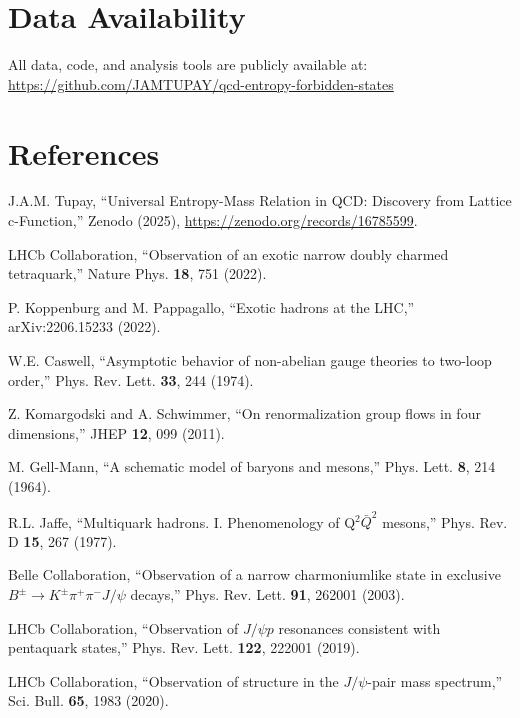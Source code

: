 \documentclass[12pt,a4paper]{article}
\begin{document}
\section*{Data Availability}

All data, code, and analysis tools are publicly available at: \url{https://github.com/JAMTUPAY/qcd-entropy-forbidden-states}

\section*{References}

\begin{thebibliography}{99}

J.A.M. Tupay,
``Universal Entropy-Mass Relation in QCD: Discovery from Lattice c-Function,''
Zenodo (2025),
\url{https://zenodo.org/records/16785599}.

LHCb Collaboration,
``Observation of an exotic narrow doubly charmed tetraquark,''
Nature Phys. \textbf{18}, 751 (2022).

P. Koppenburg and M. Pappagallo,
``Exotic hadrons at the LHC,''
arXiv:2206.15233 (2022).

W.E. Caswell,
``Asymptotic behavior of non-abelian gauge theories to two-loop order,''
Phys. Rev. Lett. \textbf{33}, 244 (1974).

Z. Komargodski and A. Schwimmer,
``On renormalization group flows in four dimensions,''
JHEP \textbf{12}, 099 (2011).

M. Gell-Mann,
``A schematic model of baryons and mesons,''
Phys. Lett. \textbf{8}, 214 (1964).

R.L. Jaffe,
``Multiquark hadrons. I. Phenomenology of Q$^2\bar{Q}^2$ mesons,''
Phys. Rev. D \textbf{15}, 267 (1977).

Belle Collaboration,
``Observation of a narrow charmoniumlike state in exclusive $B^\pm \to K^\pm \pi^+ \pi^- J/\psi$ decays,''
Phys. Rev. Lett. \textbf{91}, 262001 (2003).

LHCb Collaboration,
``Observation of $J/\psi p$ resonances consistent with pentaquark states,''
Phys. Rev. Lett. \textbf{122}, 222001 (2019).

LHCb Collaboration,
``Observation of structure in the $J/\psi$-pair mass spectrum,''
Sci. Bull. \textbf{65}, 1983 (2020).


\end{thebibliography}
\end{document}
